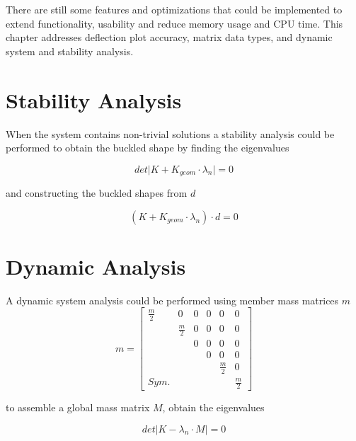 There are still some features and optimizations that could be implemented to extend functionality, usability and reduce memory usage and CPU time.
This chapter addresses deflection plot accuracy, matrix data types, and dynamic system and stability analysis.

\section{Stability Analysis}
\label{sec:stabAna}

When the system contains non-trivial solutions a stability analysis could be performed to obtain the buckled shape by finding the eigenvalues

\begin{equation*} \label{eigenvalues}
det \lvert K + K_{geom} \cdot \lambda_n \lvert = 0 
\end{equation*}

and constructing the buckled shapes from $d$

\begin{equation*} \label{buckle}
( K + K_{geom} \cdot \lambda_n ) \cdot d = 0
\end{equation*}

\section{Dynamic Analysis}
\label{sec:dynAna}

A dynamic system analysis could be performed using member mass matrices $m$ 
\begin{equation} \label{strut3}
    m = \begin{bmatrix}
         \frac{m}{2} & 0		   & 0 & 0 & 0           & 0 \\
                     & \frac{m}{2} & 0 & 0 & 0           & 0 \\
                     &             & 0 & 0 & 0           & 0 \\
                     &             &   & 0 & 0           & 0 \\
                     &             &   &   & \frac{m}{2} & 0 \\
        Sym.         &             &   &   &             & \frac{m}{2}
    \end{bmatrix}
\end{equation}

to assemble a global mass matrix $M$, obtain the eigenvalues

\begin{equation*} \label{eigenvalues2}
det \lvert K - \lambda_n \cdot M \lvert = 0 
\end{equation*}


